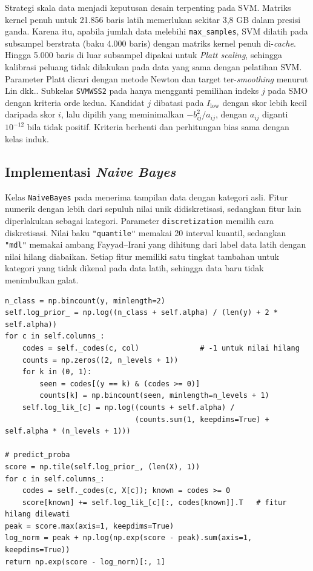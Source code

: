 Strategi skala data menjadi keputusan desain terpenting pada SVM. Matriks kernel penuh untuk 21.856 baris latih memerlukan sekitar 3,8 GB dalam presisi ganda. Karena itu, apabila jumlah data melebihi \texttt{max\_samples}, SVM dilatih pada subsampel berstrata (baku 4.000 baris) dengan matriks kernel penuh di-\textit{cache}. Hingga 5.000 baris di luar subsampel dipakai untuk \textit{Platt scaling}, sehingga kalibrasi peluang tidak dilakukan pada data yang sama dengan pelatihan SVM. Parameter Platt dicari dengan metode Newton dan target ter-\textit{smoothing} menurut Lin dkk.. Subkelas \texttt{SVMWSS2} pada  hanya mengganti pemilihan indeks $j$ pada SMO dengan kriteria orde kedua. Kandidat $j$ dibatasi pada $I_{\mathrm{low}}$ dengan skor lebih kecil daripada skor $i$, lalu dipilih yang meminimalkan $-b_{ij}^2/a_{ij}$, dengan $a_{ij}$ diganti $10^{-12}$ bila tidak positif. Kriteria berhenti dan perhitungan bias sama dengan kelas induk.

\subsection{Implementasi \textit{Naive Bayes}}
Kelas \texttt{NaiveBayes} pada  menerima tampilan data dengan kategori asli. Fitur numerik dengan lebih dari sepuluh nilai unik didiskretisasi, sedangkan fitur lain diperlakukan sebagai kategori. Parameter \texttt{discretization} memilih cara diskretisasi. Nilai baku \texttt{"quantile"} memakai 20 interval kuantil, sedangkan \texttt{"mdl"} memakai ambang Fayyad--Irani yang dihitung dari label data latih dengan nilai hilang diabaikan. Setiap fitur memiliki satu tingkat tambahan untuk kategori yang tidak dikenal pada data latih, sehingga data baru tidak menimbulkan galat.

\begin{lstlisting}[emph={fit,predict_proba},caption={Estimasi \textit{likelihood} dengan Laplace smoothing dan normalisasi \textit{log-sum-exp} (\texttt{src/naive\_bayes.py}, diringkas)},label={lst:nb}]
n_class = np.bincount(y, minlength=2)
self.log_prior_ = np.log((n_class + self.alpha) / (len(y) + 2 * self.alpha))
for c in self.columns_:
    codes = self._codes(c, col)              # -1 untuk nilai hilang
    counts = np.zeros((2, n_levels + 1))
    for k in (0, 1):
        seen = codes[(y == k) & (codes >= 0)]
        counts[k] = np.bincount(seen, minlength=n_levels + 1)
    self.log_lik_[c] = np.log((counts + self.alpha) /
                              (counts.sum(1, keepdims=True) + self.alpha * (n_levels + 1)))

# predict_proba
score = np.tile(self.log_prior_, (len(X), 1))
for c in self.columns_:
    codes = self._codes(c, X[c]); known = codes >= 0
    score[known] += self.log_lik_[c][:, codes[known]].T   # fitur hilang dilewati
peak = score.max(axis=1, keepdims=True)
log_norm = peak + np.log(np.exp(score - peak).sum(axis=1, keepdims=True))
return np.exp(score - log_norm)[:, 1]
\end{lstlisting}

